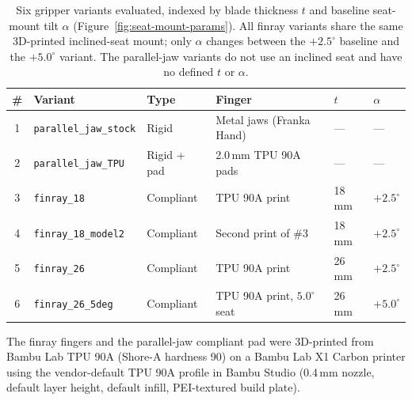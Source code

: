 \begin{table}[ht]
\centering
\caption[Gripper variants]{Six gripper variants evaluated, indexed by
blade thickness $t$ and baseline seat-mount tilt $\alpha$
(Figure~\ref{fig:seat-mount-params}).
All finray variants share the same 3D-printed inclined-seat mount; only
$\alpha$ changes between the $+2.5^{\circ}$ baseline and the $+5.0^{\circ}$
variant. The parallel-jaw variants do not use an inclined seat and have
no defined $t$ or $\alpha$.}
\label{tab:variants}
\small
\begin{tabular}{clllll}
\toprule
\# & Variant & Type & Finger & $t$ & $\alpha$ \\
\midrule
1 & \texttt{parallel\_jaw\_stock} & Rigid       & Metal jaws (Franka Hand)   & --- & --- \\
2 & \texttt{parallel\_jaw\_TPU}   & Rigid + pad & 2.0\,mm TPU 90A pads & --- & --- \\
3 & \texttt{finray\_18}           & Compliant   & TPU 90A print              & 18\,mm & $+2.5^{\circ}$ \\
4 & \texttt{finray\_18\_model2}   & Compliant   & Second print of \#3        & 18\,mm & $+2.5^{\circ}$ \\
5 & \texttt{finray\_26}           & Compliant   & TPU 90A print              & 26\,mm & $+2.5^{\circ}$ \\
6 & \texttt{finray\_26\_5deg}     & Compliant   & TPU 90A print, $5.0^{\circ}$ seat & 26\,mm & $+5.0^{\circ}$ \\
\bottomrule
\end{tabular}
\end{table}

The finray fingers and the parallel-jaw compliant pad were 3D-printed from
Bambu Lab TPU 90A (Shore-A hardness 90) on a Bambu Lab X1 Carbon printer
using the vendor-default TPU 90A profile in Bambu Studio (0.4\,mm nozzle,
default layer height, default infill, PEI-textured build plate).


